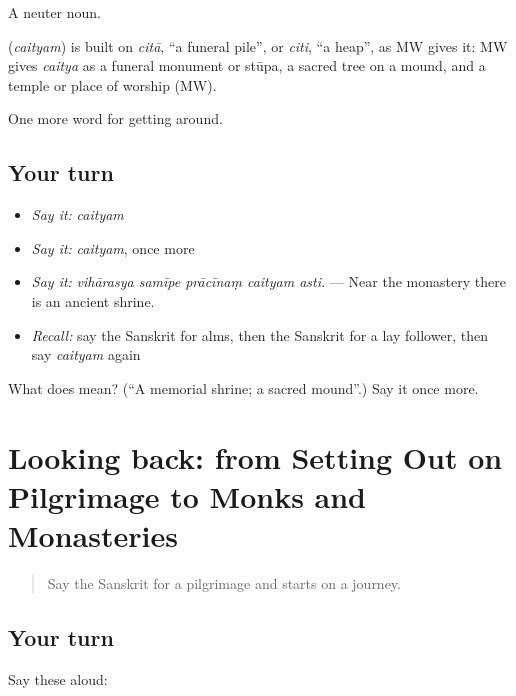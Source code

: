A neuter noun.

\begin{cousinweb}
\textbf{} (\emph{caityam}) is built on \emph{citā}, \textquotedblleft{}a funeral pile\textquotedblright{}, or \emph{citi}, \textquotedblleft{}a heap\textquotedblright{}, as MW gives it: MW gives \emph{caitya} as a funeral monument or stūpa, a sacred tree on a mound, and a temple or place of worship (MW).
\end{cousinweb}

\begin{grammarlens}[title={What you've built}]
One more word for getting around.
\end{grammarlens}

\subsection*{Your turn}
\begin{itemize}
\raggedright
  \item \emph{Say it:} \emph{caityam}
  \item \emph{Say it:} \emph{caityam}, once more
  \item \emph{Say it:} \emph{vihārasya samīpe prācīnaṃ caityam asti.} — Near the monastery there is an ancient shrine.
  \item \emph{Recall:} say the Sanskrit for alms, then the Sanskrit for a lay follower, then say \emph{caityam} again
\end{itemize}

\begin{tcolorbox}[breakable,colback=teal!4,colframe=teal!35!black,title={Before you move on}]
What does  mean? (\textquotedblleft{}A memorial shrine; a sacred mound\textquotedblright{}.) Say it once more.
\end{tcolorbox}
\section[(dialogue)]{Looking back: from Setting Out on Pilgrimage to Monks and Monasteries}

\label{lesson:SA-R401-review-394-401}



\begin{quote}
Say the Sanskrit for a pilgrimage and starts on a journey.
\end{quote}

\subsection*{Your turn}
Say these aloud:

